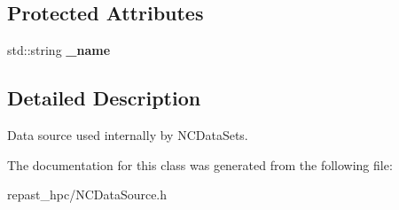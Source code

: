\subsection*{Protected Attributes}
\begin{DoxyCompactItemize}
\item 
\hypertarget{classrepast_1_1_n_c_data_source_a6bc7455c847f7296f84c85df369b6631}{std\-::string {\bfseries \-\_\-name}}\label{classrepast_1_1_n_c_data_source_a6bc7455c847f7296f84c85df369b6631}

\end{DoxyCompactItemize}


\subsection{Detailed Description}
Data source used internally by N\-C\-Data\-Sets. 

The documentation for this class was generated from the following file\-:\begin{DoxyCompactItemize}
\item 
repast\-\_\-hpc/N\-C\-Data\-Source.\-h\end{DoxyCompactItemize}
